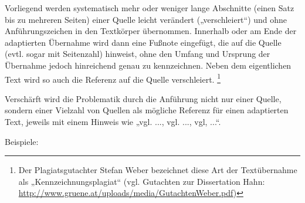 \documentclass[ngerman,final,fontsize=12pt,paper=a4,twoside,bibliography=totoc,BCOR=8mm,draft=false]{scrartcl}
\begin{document}
Vorliegend werden systematisch mehr oder weniger lange Abschnitte (einen Satz bis zu mehreren Seiten) einer Quelle leicht verändert („verschleiert“) und ohne Anführungszeichen in den Textkörper übernommen. Innerhalb oder am Ende der adaptierten Übernahme wird dann eine Fußnote eingefügt, die auf die Quelle (evtl. sogar mit Seitenzahl) hinweist, ohne den Umfang und Ursprung der Übernahme jedoch hinreichend genau zu kennzeichnen. Neben dem eigentlichen Text wird so auch die Referenz auf die Quelle verschleiert.%
\footnote{ Der Plagiatsgutachter Stefan Weber bezeichnet diese Art der Textübernahme als „Kennzeichnungsplagiat“ (vgl. Gutachten zur Dissertation Hahn: \url{http://www.gruene.at/uploads/media/GutachtenWeber.pdf})} 


Verschärft wird die Problematik durch die Anführung nicht nur einer Quelle, sondern einer Vielzahl von Quellen als mögliche Referenz für einen adaptierten Text, jeweils mit einem Hinweis wie „vgl. ..., vgl. ..., vgl, ...“. 


Beispiele: 
\end{document}
